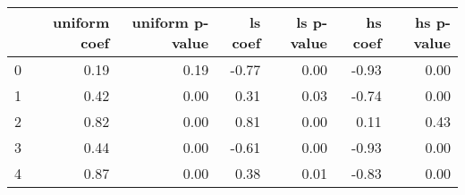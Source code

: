 \begin{tabular}{lrrrrrr}
\toprule
 & uniform coef & uniform p-value & ls coef & ls p-value & hs coef & hs p-value \\
\midrule
0 & 0.19 & 0.19 & -0.77 & 0.00 & -0.93 & 0.00 \\
1 & 0.42 & 0.00 & 0.31 & 0.03 & -0.74 & 0.00 \\
2 & 0.82 & 0.00 & 0.81 & 0.00 & 0.11 & 0.43 \\
3 & 0.44 & 0.00 & -0.61 & 0.00 & -0.93 & 0.00 \\
4 & 0.87 & 0.00 & 0.38 & 0.01 & -0.83 & 0.00 \\
\bottomrule
\end{tabular}
